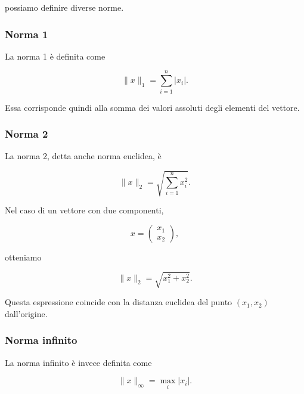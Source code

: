 possiamo definire diverse norme.


\subsubsection{Norma 1}

La norma 1 è definita come

\begin{equation*}
    \|x\|_1
    =
    \sum_{i=1}^{n}|x_i|.
    \label{eq:norma1}
\end{equation*}

Essa corrisponde quindi alla somma dei valori assoluti degli
elementi del vettore.


\subsubsection{Norma 2}

La norma 2, detta anche norma euclidea, è

\begin{equation*}
    \|x\|_2
    =
    \sqrt{
        \sum_{i=1}^{n}x_i^2
    }.
    \label{eq:norma2}
\end{equation*}

Nel caso di un vettore con due componenti,

\begin{equation*}
    x=
    \begin{pmatrix}
        x_1\\
        x_2
    \end{pmatrix},
\end{equation*}

otteniamo

\begin{equation*}
    \|x\|_2
    =
    \sqrt{x_1^2+x_2^2}.
\end{equation*}

Questa espressione coincide con la distanza euclidea del punto
$(x_1,x_2)$ dall'origine.


\subsubsection{Norma infinito}

La norma infinito è invece definita come

\begin{equation*}
    \|x\|_\infty
    =
    \max_i |x_i|.
    \label{eq:normainf}
\end{equation*}

